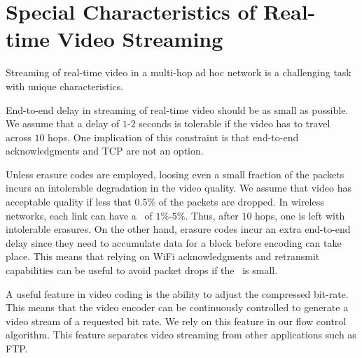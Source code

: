 \documentclass[12pt,oneside,english,a4paper]{book}
\theoremstyle{plain}
\theoremstyle{definition}
\theoremstyle{Theorem}
\theoremstyle{plain}
\newenvironment{proof sketch}[1]{\noindent {\emph{Proof sketch of #1:}}}{\hfill \qed}
\newcommand{\PER}{\text{\sc{per}}}
\begin{document}
\section{Special Characteristics of Real-time Video Streaming}
Streaming of real-time video in a multi-hop ad hoc network is a
challenging task with unique characteristics.
\begin{inparaenum}[(1)]
\item End-to-end delay in streaming of real-time video should be as
  small as possible.  We assume that a delay of $1$-$2$ seconds is
  tolerable if the video has to travel across $10$ hops.  One
  implication of this constraint is that end-to-end acknowledgments and TCP are
  not an option.
\item Unless erasure codes are employed, loosing even a small fraction
  of the packets incurs an intolerable degradation in the video
  quality. We assume that video has acceptable quality if less that
  $0.5\%$ of the packets are dropped. In wireless networks, each link
  can have a \PER\ of $1\%$-$5\%$. Thus, after $10$ hops, one is left
  with intolerable erasures.  On the other hand, erasure codes incur an
  extra end-to-end delay since they need to accumulate data for a
  block before encoding can take place. This means that relying on
  WiFi acknowledgments and retransmit capabilities can be useful to
  avoid packet drops if the \PER\ is small.
\item A useful feature in video coding is the ability to adjust the
  compressed bit-rate. This means that the video encoder can be
  continuously controlled to generate a video stream of a requested
  bit rate. We rely on this feature in our flow control algorithm.
  This feature separates video streaming from other applications such
  as FTP.
\end{inparaenum}
\end{document}
